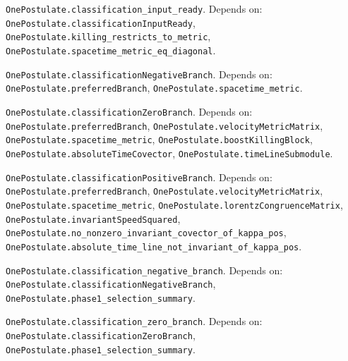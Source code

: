 \begin{lemma}\label{OnePostulate.classification_input_ready}
\texttt{OnePostulate.classification\_input\_ready}. Depends on: \texttt{OnePostulate.classificationInputReady}, \texttt{OnePostulate.killing\_restricts\_to\_metric}, \texttt{OnePostulate.spacetime\_metric\_eq\_diagonal}.
\end{lemma}

\begin{definition}\label{OnePostulate.classificationNegativeBranch}
\texttt{OnePostulate.classificationNegativeBranch}. Depends on: \texttt{OnePostulate.preferredBranch}, \texttt{OnePostulate.spacetime\_metric}.
\end{definition}

\begin{definition}\label{OnePostulate.classificationZeroBranch}
\texttt{OnePostulate.classificationZeroBranch}. Depends on: \texttt{OnePostulate.preferredBranch}, \texttt{OnePostulate.velocityMetricMatrix}, \texttt{OnePostulate.spacetime\_metric}, \texttt{OnePostulate.boostKillingBlock}, \texttt{OnePostulate.absoluteTimeCovector}, \texttt{OnePostulate.timeLineSubmodule}.
\end{definition}

\begin{definition}\label{OnePostulate.classificationPositiveBranch}
\texttt{OnePostulate.classificationPositiveBranch}. Depends on: \texttt{OnePostulate.preferredBranch}, \texttt{OnePostulate.velocityMetricMatrix}, \texttt{OnePostulate.spacetime\_metric}, \texttt{OnePostulate.lorentzCongruenceMatrix}, \texttt{OnePostulate.invariantSpeedSquared}, \texttt{OnePostulate.no\_nonzero\_invariant\_covector\_of\_kappa\_pos}, \texttt{OnePostulate.absolute\_time\_line\_not\_invariant\_of\_kappa\_pos}.
\end{definition}

\begin{lemma}\label{OnePostulate.classification_negative_branch}
\texttt{OnePostulate.classification\_negative\_branch}. Depends on: \texttt{OnePostulate.classificationNegativeBranch}, \texttt{OnePostulate.phase1\_selection\_summary}.
\end{lemma}

\begin{lemma}\label{OnePostulate.classification_zero_branch}
\texttt{OnePostulate.classification\_zero\_branch}. Depends on: \texttt{OnePostulate.classificationZeroBranch}, \texttt{OnePostulate.phase1\_selection\_summary}.
\end{lemma}

